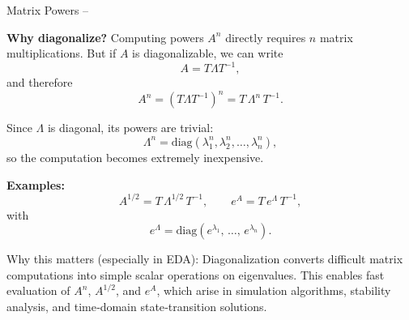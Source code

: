 \begin{frame}[t,allowframebreaks]{Matrix Powers --}

    \textbf{Why diagonalize?}
    Computing powers $A^n$ directly requires $n$ matrix multiplications.
    But if $A$ is diagonalizable, we can write
    \[
        A = T \Lambda T^{-1},
    \]
    and therefore
    \[
        A^n = (T \Lambda T^{-1})^n = T\, \Lambda^n\, T^{-1}.
    \]

    Since $\Lambda$ is diagonal, its powers are trivial:
    \[
        \Lambda^n =
        \mathrm{diag}(\lambda_1^n, \lambda_2^n, \dots, \lambda_n^n),
    \]
    so the computation becomes extremely inexpensive.

    \medskip
    \pagebreak

    \textbf{Examples:}
    \[
        A^{1/2} = T\, \Lambda^{1/2}\, T^{-1},
        \qquad
        e^A = T\, e^{\Lambda}\, T^{-1},
    \]
    with
    \[
        e^\Lambda =
        \mathrm{diag}(e^{\lambda_1},\, \dots,\, e^{\lambda_n}).
    \]

    \begin{alertblock}{Why this matters (especially in EDA):}\smallskip
        Diagonalization converts difficult matrix computations into simple scalar
        operations on eigenvalues.
        This enables fast evaluation of $A^n$, $A^{1/2}$, and $e^A$, which arise in
        simulation algorithms, stability analysis, and time‑domain state‑transition solutions.
    \end{alertblock}

    \vfill

\end{frame}

